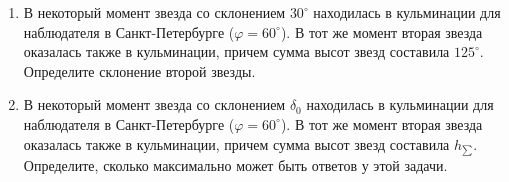 \documentclass[12pt]{article}
\begin{document}
\begin{enumerate}
        \item В некоторый момент звезда со склонением $30^{\circ}$ находилась в кульминации для наблюдателя в Санкт-Петербурге ($\varphi=60^{\circ}$). В тот же момент вторая звезда оказалась также в кульминации, причем сумма высот звезд составила $125^{\circ}$. Определите склонение второй звезды. 
        \item В некоторый момент звезда со склонением $\delta_0$ находилась в кульминации для наблюдателя в Санкт-Петербурге ($\varphi=60^{\circ}$). В тот же момент вторая звезда оказалась также в кульминации, причем сумма высот звезд составила $h_{\sum}$. Определите, сколько максимально может быть ответов у этой задачи.
 \end{enumerate}
\end{document}
